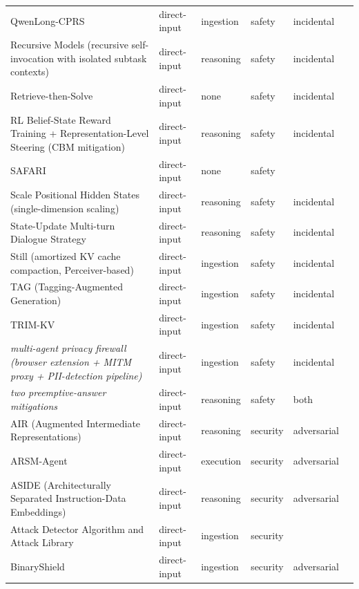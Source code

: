 \begin{longtable}{@{}>{\raggedright\arraybackslash}p{}lllll@{}}
QwenLong-CPRS & direct-input & ingestion & safety & incidental & \cite{shen-2025-qwenlongcprs} \\
Recursive Models (recursive self-invocation with isolated subtask contexts) & direct-input & reasoning & safety & incidental & \cite{yang-2026-recursive} \\
Retrieve-then-Solve & direct-input & none & safety & incidental & \cite{du-2025-context} \\
RL Belief-State Reward Training + Representation-Level Steering (CBM mitigation) & direct-input & reasoning & safety & incidental & \cite{xu-2026-should} \\
SAFARI & direct-input & none & safety &  & \cite{zhu-2026-safari} \\
Scale Positional Hidden States (single-dimension scaling) & direct-input & reasoning & safety & incidental & \cite{yu-2024-mitigate} \\
State-Update Multi-turn Dialogue Strategy & direct-input & reasoning & safety & incidental & \cite{liu-2025-stateupdate} \\
Still (amortized KV cache compaction, Perceiver-based) & direct-input & ingestion & safety & incidental & \cite{oneill-2026-still} \\
TAG (Tagging-Augmented Generation) & direct-input & ingestion & safety & incidental & \cite{pal-2025-taggingaugmented} \\
TRIM-KV & direct-input & ingestion & safety & incidental & \cite{bui-2025-cache} \\
\emph{multi-agent privacy firewall (browser extension + MITM proxy + PII-detection pipeline)} & direct-input & ingestion & safety & incidental & \cite{cuesta-2026-multiagent} \\
\emph{two preemptive-answer mitigations} & direct-input & reasoning & safety & both & \cite{xu-2024-preemptive} \\
AIR (Augmented Intermediate Representations) & direct-input & reasoning & security & adversarial & \cite{kariyappa-2025-stronger} \\
ARSM-Agent & direct-input & execution & security & adversarial & \cite{hu-2026-research} \\
ASIDE (Architecturally Separated Instruction-Data Embeddings) & direct-input & reasoning & security & adversarial & \cite{zverev-2025-aside} \\
Attack Detector Algorithm and Attack Library & direct-input & ingestion & security &  & \cite{alla-2025-cyberattacks} \\
BinaryShield & direct-input & ingestion & security & adversarial & \cite{gill-2025-binaryshield} \\

\end{longtable}
